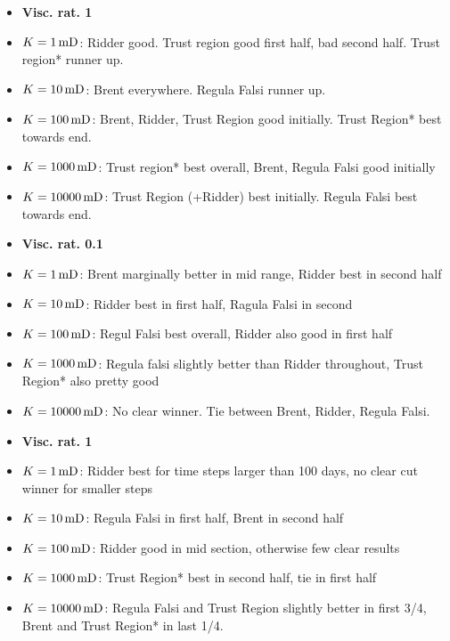 \documentclass[a4paper,12pt]{report}
\begin{document}
\begin{itemize}
\item \textbf{Visc. rat. 1}
\item $K = \unit[1]{mD}$: Ridder good. Trust region good first half, bad second half. Trust region* runner up.
\item $K = \unit[10]{mD}$: Brent everywhere. Regula Falsi runner up.
\item $K = \unit[100]{mD}$: Brent, Ridder, Trust Region good initially. Trust Region* best towards end.
\item $K = \unit[1000]{mD}$: Trust region* best overall, Brent, Regula Falsi good initially
\item $K = \unit[10000]{mD}$: Trust Region (+Ridder) best initially. Regula Falsi best towards end.
\end{itemize}

\begin{itemize}
\item \textbf{Visc. rat. 0.1}
\item $K = \unit[1]{mD}$: Brent marginally better in mid range, Ridder best in second half
\item $K = \unit[10]{mD}$: Ridder best in first half, Ragula Falsi in second
\item $K = \unit[100]{mD}$: Regul Falsi best overall, Ridder also good in first half
\item $K = \unit[1000]{mD}$: Regula falsi slightly better than Ridder throughout, Trust Region* also pretty good
\item $K = \unit[10000]{mD}$: No clear winner. Tie between Brent, Ridder, Regula Falsi.
\end{itemize}

\begin{itemize}
\item \textbf{Visc. rat. 1}
\item $K = \unit[1]{mD}$: Ridder best for time steps larger than 100 days, no clear cut winner for smaller steps
\item $K = \unit[10]{mD}$: Regula Falsi in first half, Brent in second half
\item $K = \unit[100]{mD}$: Ridder good in mid section, otherwise few clear results
\item $K = \unit[1000]{mD}$: Trust Region* best in second half, tie in first half
\item $K = \unit[10000]{mD}$: Regula Falsi and Trust Region slightly better in first 3/4, Brent and Trust Region* in last 1/4.
\end{itemize}
\end{document}
